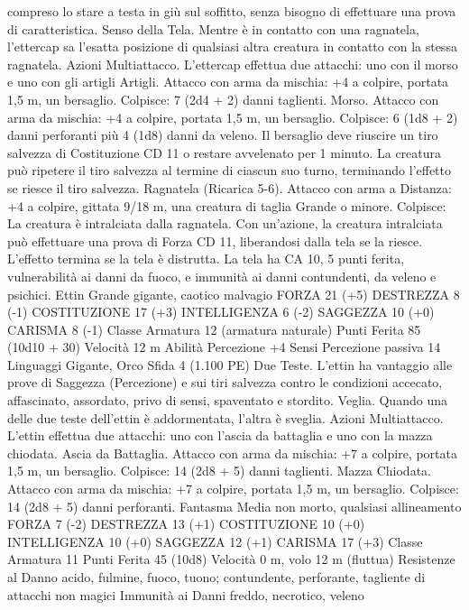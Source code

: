\begin{multicols}{2}
compreso lo stare a testa in giù sul soffitto, senza bisogno di
effettuare una prova di caratteristica.
Senso della Tela. Mentre è in contatto con una ragnatela,
l’ettercap sa l’esatta posizione di qualsiasi altra creatura in
contatto con la stessa ragnatela.
Azioni
Multiattacco. L’ettercap effettua due attacchi: uno con il morso e
uno con gli artigli
Artigli. Attacco con arma da mischia: +4 a colpire, portata 1,5
m, un bersaglio.
Colpisce: 7 (2d4 + 2) danni taglienti.
Morso. Attacco con arma da mischia: +4 a colpire, portata 1,5
m, un bersaglio.
Colpisce: 6 (1d8 + 2) danni perforanti più 4 (1d8) danni da
veleno. Il bersaglio deve riuscire un tiro salvezza di Costituzione
CD 11 o restare avvelenato per 1 minuto. La creatura può
ripetere il tiro salvezza al termine di ciascun suo turno,
terminando l’effetto se riesce il tiro salvezza.
Ragnatela (Ricarica 5-6). Attacco con arma a Distanza: +4 a
colpire, gittata 9/18 m, una creatura di taglia Grande o minore.
Colpisce: La creatura è intralciata dalla ragnatela. Con
un’azione, la creatura intralciata può effettuare una prova di
Forza CD 11, liberandosi dalla tela se la riesce. L’effetto termina
se la tela è distrutta. La tela ha CA 10, 5 punti ferita,
vulnerabilità ai danni da fuoco, e immunità ai danni contundenti,
da veleno e psichici.
Ettin
Grande gigante, caotico malvagio
FORZA 21 (+5)
DESTREZZA 8 (-1)
COSTITUZIONE 17 (+3)
INTELLIGENZA 6 (-2)
SAGGEZZA 10 (+0)
CARISMA 8 (-1)
Classe Armatura 12 (armatura naturale)
Punti Ferita 85 (10d10 + 30)
Velocità 12 m
Abilità Percezione +4
Sensi Percezione passiva 14
Linguaggi Gigante, Orco
Sfida 4 (1.100 PE)
Due Teste. L’ettin ha vantaggio alle prove di Saggezza
(Percezione) e sui tiri salvezza contro le condizioni accecato,
affascinato, assordato, privo di sensi, spaventato e stordito.
Veglia. Quando una delle due teste dell’ettin è addormentata,
l’altra è sveglia.
Azioni
Multiattacco. L’ettin effettua due attacchi: uno con l’ascia da
battaglia e uno con la mazza chiodata.
Ascia da Battaglia. Attacco con arma da mischia: +7 a colpire,
portata 1,5 m, un bersaglio.
Colpisce: 14 (2d8 + 5) danni taglienti.
Mazza Chiodata. Attacco con arma da mischia: +7 a colpire,
portata 1,5 m, un bersaglio.
Colpisce: 14 (2d8 + 5) danni perforanti.
Fantasma
Media non morto, qualsiasi allineamento
FORZA 7 (-2)
DESTREZZA 13 (+1)
COSTITUZIONE 10 (+0)
INTELLIGENZA 10 (+0)
SAGGEZZA 12 (+1)
CARISMA 17 (+3)
Classe Armatura 11
Punti Ferita 45 (10d8)
Velocità 0 m, volo 12 m (fluttua)
Resistenze al Danno acido, fulmine, fuoco, tuono; contundente,
perforante, tagliente di attacchi non magici
Immunità ai Danni freddo, necrotico, veleno

\end{multicols}
